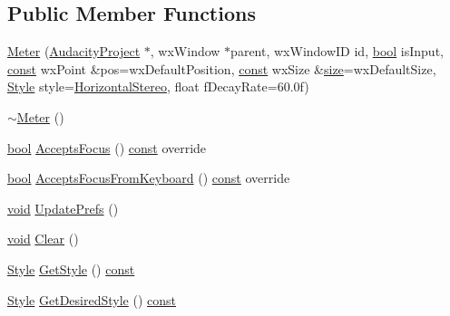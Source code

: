 \subsection*{Public Member Functions}
\begin{DoxyCompactItemize}
\item 
\hyperlink{class_meter_a842e02ad79b03149ea184592679ec979}{Meter} (\hyperlink{class_audacity_project}{Audacity\+Project} $\ast$, wx\+Window $\ast$parent, wx\+Window\+ID id, \hyperlink{mac_2config_2i386_2lib-src_2libsoxr_2soxr-config_8h_abb452686968e48b67397da5f97445f5b}{bool} is\+Input, \hyperlink{getopt1_8c_a2c212835823e3c54a8ab6d95c652660e}{const} wx\+Point \&pos=wx\+Default\+Position, \hyperlink{getopt1_8c_a2c212835823e3c54a8ab6d95c652660e}{const} wx\+Size \&\hyperlink{group__lavu__mem_ga854352f53b148adc24983a58a1866d66}{size}=wx\+Default\+Size, \hyperlink{class_meter_ad530f6dcdd5d69c0380edc4441bec5a9}{Style} style=\hyperlink{class_meter_ad530f6dcdd5d69c0380edc4441bec5a9a17ea8bf51dd8fb95c0497297d58ed691}{Horizontal\+Stereo}, float f\+Decay\+Rate=60.\+0f)
\item 
\hyperlink{class_meter_a7f152fa166e30cb157bcc8a71bda53f9}{$\sim$\+Meter} ()
\item 
\hyperlink{mac_2config_2i386_2lib-src_2libsoxr_2soxr-config_8h_abb452686968e48b67397da5f97445f5b}{bool} \hyperlink{class_meter_ab41a100677f72a97b4e5b8c050edb57d}{Accepts\+Focus} () \hyperlink{getopt1_8c_a2c212835823e3c54a8ab6d95c652660e}{const}  override
\item 
\hyperlink{mac_2config_2i386_2lib-src_2libsoxr_2soxr-config_8h_abb452686968e48b67397da5f97445f5b}{bool} \hyperlink{class_meter_a5e1dcce3961496b3970f01b399a32071}{Accepts\+Focus\+From\+Keyboard} () \hyperlink{getopt1_8c_a2c212835823e3c54a8ab6d95c652660e}{const}  override
\item 
\hyperlink{sound_8c_ae35f5844602719cf66324f4de2a658b3}{void} \hyperlink{class_meter_a65d6a3b400fdc3fab3776a89d8a5182c}{Update\+Prefs} ()
\item 
\hyperlink{sound_8c_ae35f5844602719cf66324f4de2a658b3}{void} \hyperlink{class_meter_a29e7cd76413492193f25558dbaf1792f}{Clear} ()
\item 
\hyperlink{class_meter_ad530f6dcdd5d69c0380edc4441bec5a9}{Style} \hyperlink{class_meter_a524e091e2244a9269e5883ae6ce70dc7}{Get\+Style} () \hyperlink{getopt1_8c_a2c212835823e3c54a8ab6d95c652660e}{const} 
\item 
\hyperlink{class_meter_ad530f6dcdd5d69c0380edc4441bec5a9}{Style} \hyperlink{class_meter_a7128203be286475bfee50d52d5312092}{Get\+Desired\+Style} () \hyperlink{getopt1_8c_a2c212835823e3c54a8ab6d95c652660e}{const} 

\end{DoxyCompactItemize}
